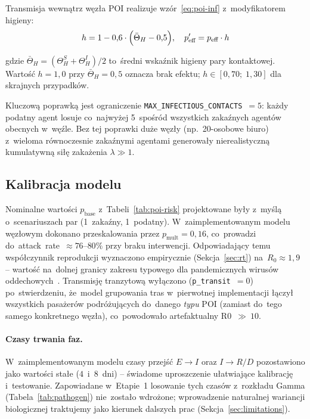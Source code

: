 \documentclass[polish]{projectreport}
\begin{document}
Transmisja wewnątrz węzła POI realizuje wzór~\eqref{eq:poi-inf}
z~modyfikatorem higieny:
\begin{equation}
  h = 1 - 0{,}6 \cdot \Bigl(\bar{\Theta}_H - 0{,}5\Bigr),
  \quad p_{\text{eff}}' = p_{\text{eff}} \cdot h
  \label{eq:hygiene-factor}
\end{equation}

\noindent gdzie $\bar{\Theta}_H = (\Theta_H^S + \Theta_H^I)/2$ to~średni
wskaźnik higieny pary kontaktowej. Wartość $h=1{,}0$ przy $\bar{\Theta}_H=0{,}5$
oznacza brak efektu; $h \in [0{,}70;\;1{,}30]$ dla skrajnych przypadków.

Kluczową poprawką jest ograniczenie \texttt{MAX\_INFECTIOUS\_CONTACTS}~$= 5$:
każdy podatny agent losuje co~najwyżej 5~spośród wszystkich zakaźnych agentów
obecnych w~węźle. Bez tej poprawki duże węzły (np.\ 20-osobowe biuro) z~wieloma
równoczesnie zakaźnymi agentami generowały nierealistyczną kumulatywną
siłę zakażenia $\lambda \gg 1$.

\subsection{Kalibracja modelu}
\label{sec:calibration}

Nominalne wartości $p_{\text{base}}$ z~Tabeli~\ref{tab:poi-risk} projektowane
były z~myślą o~scenariuszach par (1~zakaźny, 1~podatny).
W~zaimplementowanym modelu węzłowym dokonano przeskalowania przez
$p_{\text{mult}} = 0{,}16$, co~prowadzi do~attack~rate~$\approx 76$--$80\%$
przy braku interwencji. Odpowiadający temu współczynnik reprodukcji
wyznaczono empirycznie (Sekcja~\ref{sec:rt}) na~$R_0 \approx 1{,}9$ -- wartość
na~dolnej granicy zakresu typowego dla pandemicznych wirusów
oddechowych~\cite{anderson1992infectious}. Transmisję tranzytową wyłączono
(\texttt{p\_transit}~$=0$) po~stwierdzeniu, że~model grupowania tras
w~pierwotnej implementacji łączył wszystkich pasażerów podróżujących
do~danego \emph{typu} POI (zamiast do~tego samego konkretnego węzła),
co~powodowało artefaktualny R0~$\gg~10$.

\paragraph{Czasy trwania faz.} W~zaimplementowanym modelu czasy przejść
$E \to I$ oraz $I \to R/D$ pozostawiono jako wartości stałe
($4$~i~$8$~dni) -- świadome uproszczenie ułatwiające kalibrację i~testowanie.
Zapowiadane w~Etapie~1 losowanie tych czasów z~rozkładu Gamma
(Tabela~\ref{tab:pathogen}) nie~zostało wdrożone; wprowadzenie naturalnej
wariancji biologicznej traktujemy jako kierunek dalszych prac
(Sekcja~\ref{sec:limitations}).
\end{document}
